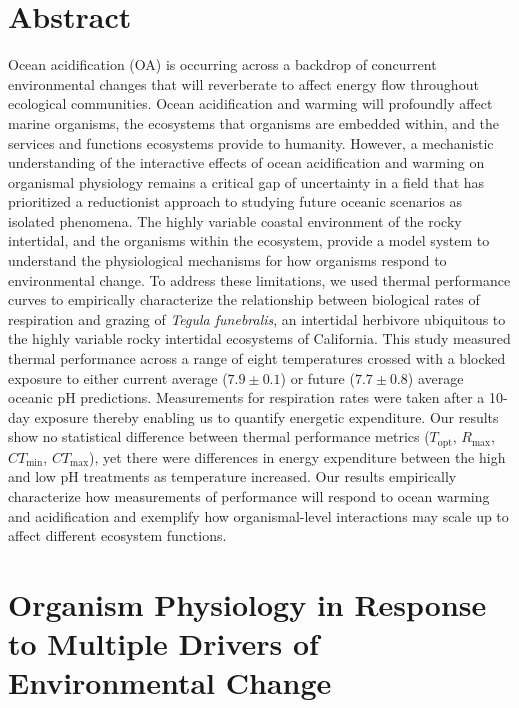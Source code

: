 \documentclass[
  12pt,
]{article}
\begin{document}
\newpage
\listoffigures
\newpage


\section*{Abstract}

Ocean acidification (OA) is occurring across a backdrop of concurrent
environmental changes that will reverberate to affect energy flow
throughout ecological communities. Ocean acidification and warming will
profoundly affect marine organisms, the ecosystems that organisms are
embedded within, and the services and functions ecosystems provide to
humanity. However, a mechanistic understanding of the interactive
effects of ocean acidification and warming on organismal physiology
remains a critical gap of uncertainty in a field that has prioritized a
reductionist approach to studying future oceanic scenarios as isolated
phenomena. The highly variable coastal environment of the rocky
intertidal, and the organisms within the ecosystem, provide a model
system to understand the physiological mechanisms for how organisms
respond to environmental change. To address these limitations, we used
thermal performance curves to empirically characterize the relationship
between biological rates of respiration and grazing of
\textit{Tegula funebralis}, an intertidal herbivore ubiquitous to the
highly variable rocky intertidal ecosystems of California. This study
measured thermal performance across a range of eight temperatures
crossed with a blocked exposure to either current average
(\(7.9 \pm 0.1\)) or future (\(7.7 \pm 0.8\)) average oceanic pH
predictions. Measurements for respiration rates were taken after a
10-day exposure thereby enabling us to quantify energetic expenditure.
Our results show no statistical difference between thermal performance
metrics (\(T_{\text{opt}}\), \(R_{\text{max}}\), \(CT_{\text{min}}\),
\(CT_{\text{max}}\)), yet there were differences in energy expenditure
between the high and low pH treatments as temperature increased. Our
results empirically characterize how measurements of performance will
respond to ocean warming and acidification and exemplify how
organismal-level interactions may scale up to affect different ecosystem
functions.

\newpage

\hypertarget{organism-physiology-in-response-to-multiple-drivers-of-environmental-change}{%
\section{Organism Physiology in Response to Multiple Drivers of
Environmental
Change}\label{organism-physiology-in-response-to-multiple-drivers-of-environmental-change}}
\end{document}
